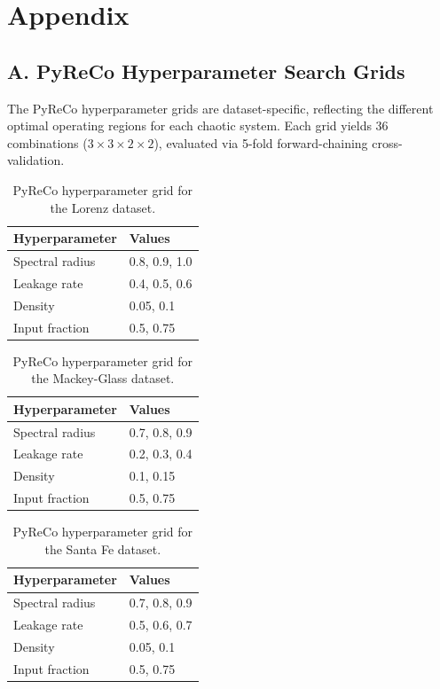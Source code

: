 \newpage
\appendix
{}
\section*{Appendix}

\subsection*{A. PyReCo Hyperparameter Search Grids}

The PyReCo hyperparameter grids are dataset-specific, reflecting the different optimal operating regions for each chaotic system. Each grid yields 36 combinations ($3 \times 3 \times 2 \times 2$), evaluated via 5-fold forward-chaining cross-validation.

\begin{table}[H]
\centering
\caption{PyReCo hyperparameter grid for the Lorenz dataset.}
\begin{tabular}{@{}ll@{}}
\toprule
Hyperparameter & Values \\
\midrule
Spectral radius & 0.8, 0.9, 1.0 \\
Leakage rate    & 0.4, 0.5, 0.6 \\
Density         & 0.05, 0.1 \\
Input fraction  & 0.5, 0.75 \\
\bottomrule
\end{tabular}
\end{table}

\begin{table}[H]
\centering
\caption{PyReCo hyperparameter grid for the Mackey-Glass dataset.}
\begin{tabular}{@{}ll@{}}
\toprule
Hyperparameter & Values \\
\midrule
Spectral radius & 0.7, 0.8, 0.9 \\
Leakage rate    & 0.2, 0.3, 0.4 \\
Density         & 0.1, 0.15 \\
Input fraction  & 0.5, 0.75 \\
\bottomrule
\end{tabular}
\end{table}

\begin{table}[H]
\centering
\caption{PyReCo hyperparameter grid for the Santa Fe dataset.}
\begin{tabular}{@{}ll@{}}
\toprule
Hyperparameter & Values \\
\midrule
Spectral radius & 0.7, 0.8, 0.9 \\
Leakage rate    & 0.5, 0.6, 0.7 \\
Density         & 0.05, 0.1 \\
Input fraction  & 0.5, 0.75 \\
\bottomrule
\end{tabular}
\end{table}

